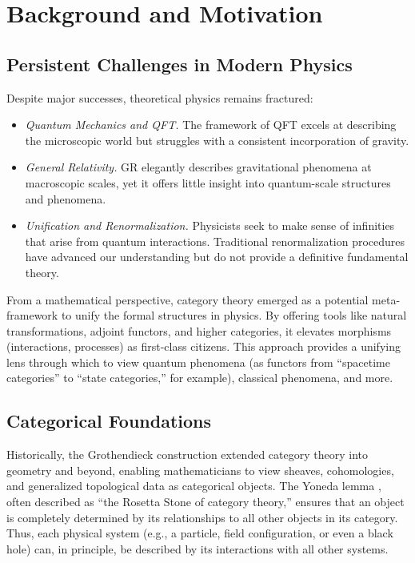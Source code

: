 \documentclass[12pt]{article}
\begin{document}
\section{Background and Motivation}

\subsection{Persistent Challenges in Modern Physics}
Despite major successes, theoretical physics remains fractured:
\begin{itemize}
\item \textit{Quantum Mechanics and QFT.} The framework of QFT excels at describing the microscopic world but struggles with a consistent incorporation of gravity.
\item \textit{General Relativity.} GR elegantly describes gravitational phenomena at macroscopic scales, yet it offers little insight into quantum-scale structures and phenomena.
\item \textit{Unification and Renormalization.} Physicists seek to make sense of infinities that arise from quantum interactions. Traditional renormalization procedures have advanced our understanding but do not provide a definitive fundamental theory.
\end{itemize}
From a mathematical perspective, category theory emerged as a potential meta-framework to unify the formal structures in physics. By offering tools like natural transformations, adjoint functors, and higher categories, it elevates morphisms (interactions, processes) as first-class citizens. This approach provides a unifying lens through which to view quantum phenomena (as functors from “spacetime categories” to “state categories,” for example), classical phenomena, and more.

\subsection{Categorical Foundations}
Historically, the Grothendieck construction \cite{Grothendieck1957} extended category theory into geometry and beyond, enabling mathematicians to view sheaves, cohomologies, and generalized topological data as categorical objects. The Yoneda lemma \cite{Yoneda1960}, often described as ``the Rosetta Stone of category theory,'' ensures that an object is completely determined by its relationships to all other objects in its category. Thus, each physical system (e.g., a particle, field configuration, or even a black hole) can, in principle, be described by its interactions with all other systems.
\end{document}

